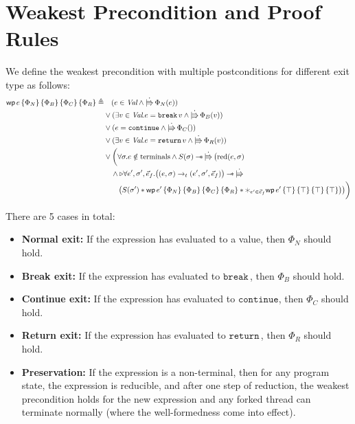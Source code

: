\documentclass{article}
\numberwithin{algorithm}{section}
\newcommand{\progspec}[1]{\{ #1 \}}
\newcommand{\cmdbreak}{\texttt{break}\,}
\newcommand{\cmdcontinue}{\texttt{continue}}
\newcommand{\cmdreturn}{\texttt{return}\,}
\newcommand{\tred}{\rightarrow_t}
\newcommand{\cred}{\text{red}}
\newcommand{\wand}{-\mkern-8mu*\,}
\newcommand{\upd}{\dot{|\mkern-8mu\Rrightarrow}\,}
\newcommand{\later}{\triangleright}
\newcommand{\wpre}[5]{\textsf{wp}\, #1\, \progspec{#2}\, \progspec{#3}\, \progspec{#4}\, \progspec{#5}}
\begin{document}

\section{Weakest Precondition and Proof Rules}

We define the weakest precondition with multiple postconditions for different exit type as follows:
$$
\begin{aligned}
    \wpre{e}{\Phi_N}{\Phi_B}{\Phi_C}{\Phi_R} \triangleq& \quad
           (e \in \textit{Val} \land \upd \Phi_N(e)) \\
    & \lor (\exists v \in \textit{Val}. e = \cmdbreak v \land \upd \Phi_B(v)) \\
    & \lor (e = \cmdcontinue \land \upd \Phi_C()) \\
    & \lor (\exists v \in \textit{Val}. e = \cmdreturn v \land \upd \Phi_R(v)) \\
    & \lor \biggl(\forall \sigma. e \notin \text{terminals} \land S(\sigma) \wand \upd \bigl(\cred(e, \sigma) \\
    & \quad \land \later
        \forall e', \sigma', \vec{e}_f. \bigl((e, \sigma) \tred (e', \sigma', \vec{e}_f)\bigr) \wand \upd \\
    & \quad\quad \bigl(S(\sigma') * \wpre{e'}{\Phi_N}{\Phi_B}{\Phi_C}{\Phi_R} * \varhexstar_{e'\in\vec{e}_f} \wpre{e'}{\top}{\top}{\top}{\top} \bigr)\bigr)\biggr)
\end{aligned}
$$

There are 5 cases in total:
\begin{itemize}
\item \textbf{Normal exit:} If the expression has evaluated to a value, then $\Phi_N$ should hold.
\item \textbf{Break exit:} If the expression has evaluated to $\cmdbreak\!$, then $\Phi_B$ should hold.
\item \textbf{Continue exit:} If the expression has evaluated to $\cmdcontinue$, then $\Phi_C$ should hold.
\item \textbf{Return exit:} If the expression has evaluated to $\cmdreturn\!$, then $\Phi_R$ should hold.
\item \textbf{Preservation:} If the expression is a non-terminal, then for any program state, the expression is reducible, and after one step of reduction, the weakest precondition holds for the new expression and any forked thread can terminate normally (where the well-formedness come into effect).
\end{itemize}
\end{document}
